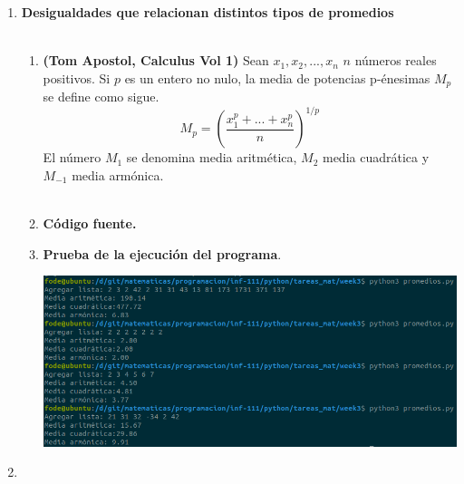 \begin{enumerate}

\item \textbf{\large Desigualdades que relacionan distintos tipos de promedios}\\\\

    \begin{enumerate}[\bfseries a)]

	\item \textbf{(Tom Apostol, Calculus Vol 1)} Sean $x_1,x_2,...,x_n$ $n$ números reales positivos. Si $p$ es un entero no nulo, la media de potencias p-énesimas $M_p$ se define como sigue.
$$M_p = \left( \dfrac{x_1^{p} + ... + x_{n}^{p}}{n} \right)^{1/p}$$
El número $M_1$ se denomina media aritmética, $M_2$ media cuadrática y $M_{-1}$ media armónica.\\\\

	\item \textbf{Código fuente.}\\ 
	    
	    
	    \vspace{1cm}
	
	\item \textbf{Prueba de la ejecución del programa}.\\
	    \begin{center}
		\includegraphics[scale=.42]{imagenes/tareas_mat/week3/promedios.png}
	    \end{center}

    \end{enumerate}

\newpage

\item

    \begin{enumerate}[\bfseries a)]


\end{enumerate}
\end{enumerate}
